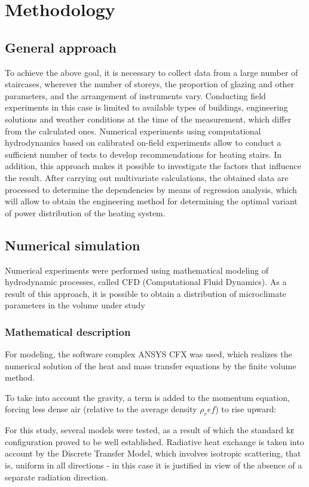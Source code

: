 \documentclass[preprint,12pt]{elsarticle}
\begin{document}
\section{Methodology}
\subsection{General approach}
To achieve the above goal, it is necessary to collect data from a large number of staircases, wherever the number of storeys, the proportion of glazing and other parameters, and the arrangement of instruments vary. Conducting field experiments in this case is limited to available types of buildings, engineering solutions and weather conditions at the time of the measurement, which differ from the calculated ones. Numerical experiments using computational hydrodynamics based on calibrated on-field experiments allow to conduct a sufficient number of tests to develop recommendations for heating stairs. In addition, this approach makes it possible to investigate the factors that influence the result. After carrying out multivariate calculations, the obtained data are processed to determine the dependencies by means of regression analysis, which will allow to obtain the engineering method for determining the optimal variant of power distribution of the heating system.

\subsection{Numerical simulation}
Numerical experiments were performed using mathematical modeling of hydrodynamic processes, called CFD (Computational Fluid Dynamics). As a result of this approach, it is possible to obtain a distribution of microclimate parameters in the volume under study

\subsubsection{Mathematical description}
For modeling, the software complex ANSYS CFX was used, which realizes the numerical solution of the heat and mass transfer equations by the finite volume method.

To take into account the gravity, a term is added to the momentum equation, forcing less dense air (relative to the average density $ρ_ref$) to rise upward:

For this study, several models were tested, as a result of which the standard kε configuration proved to be well established. Radiative heat exchange is taken into account by the Discrete Transfer Model, which involves isotropic scattering, that is, uniform in all directions - in this case it is justified in view of the absence of a separate radiation direction.
\end{document}
